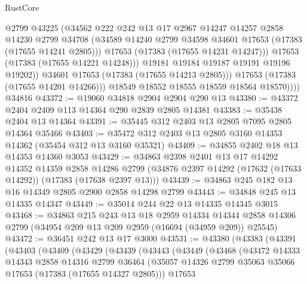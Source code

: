 \begin{lexlean}{RustCore}
\begin{coremodule}
                      @2799
                      @43225
                      (@34562
                        @222
                        @242
                        @13
                        @17
                        @2967
                        @14247
                        @14257
                        @2858
                        @14230
                        @2799
                        @34708
                        (@34589 @14240 @2799 @34598 @34601 @17653 (@17383 (@17655 @14241 @2805)))
                        @17653
                        (@17383 (@17655 @14231 @14247)))
                      @17653
                      (@17383 (@17655 @14221 @14248)))
                    @19181
                    @19184
                    @19187
                    @19191
                    @19196
                    @19202))
                @34601
                @17653
                (@17383 (@17655 @14213 @2805)))
              @17653
              (@17383 (@17655 @14201 @14266)))
            @18549
            @18552
            @18555
            @18559
            @18564
            @18570))))
    @34816
@43372 := @19060 @34818 @2904 @2904 @290 @13
@43380 := @43372 @2404 @2409 @113 @14364 @290 @2839 @2805 @14381
@43383 := @35438 @2404 @13 @14364
@43391 := @35445 @312 @2403 @13 @2805 @7095 @2805 @14364 @35466
@43403 := @35472 @312 @2403 @13 @2805 @3160 @14353 @14362 (@35454 @312 @13 @3160 @35321)
@43409 := @34855 @2402 @18 @13 @14353 @14360 @3053
@43429 := @34863
    @2398
    @2401
    @13
    @17
    @14292
    @14352
    @14359
    @2858
    @14286
    @2799
    (@34876 @2397 @14292 (@17632 (@17633 @14292)) (@17383 (@17638 @2397 @13)))
@43439 := @34863 @245 @182 @13 @16 @14349 @2805 @2900 @2858 @14298 @2799
@43443 := @34848 @245 @13 @14335 @14347
@43449 := @35014 @244 @22 @13 @14335 @14345 @3015
@43468 := @34863
    @215
    @243
    @13
    @18
    @2959
    @14334
    @14344
    @2858
    @14306
    @2799
    (@34954 @209 @13 @209 @2959 (@16694 (@34959 @209)) @25545)
@43472 := @36451 @242 @13 @17 @3000
@43531 := @43380
    (@43383
      (@43391
        (@43403
          (@43409
            (@43429
              (@43439
                (@43443
                  (@43449
                    (@43468
                      (@43472
                        @14333
                        @14343
                        @2858
                        @14316
                        @2799
                        @36464
                        (@35057 @14326 @2799 @35063 @35066 @17653 (@17383 (@17655 @14327 @2805)))
                        @17653

\end{coremodule}
\end{lexlean}

